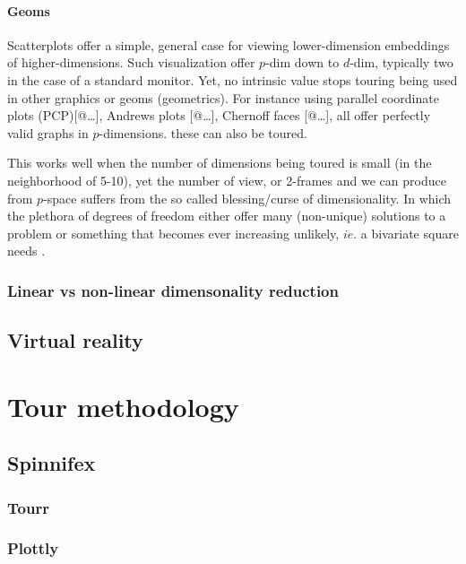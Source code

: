 \documentclass{monashthesis}
\theoremstyle{definition}
\theoremstyle{definition}
\theoremstyle{definition}
\theoremstyle{remark}
\begin{document}
\subsubsection{Geoms}\label{geoms}

Scatterplots offer a simple, general case for viewing lower-dimension
embeddings of higher-dimensions. Such visualization offer \(p\)-dim down
to \(d\)-dim, typically two in the case of a standard monitor. Yet, no
intrinsic value stops touring being used in other graphics or geoms
(geometrics). For instance using parallel coordinate plots
(PCP){[}@\ldots{}{]}, Andrews plots {[}@\ldots{}{]}, Chernoff faces
{[}@\ldots{}{]}, all offer perfectly valid graphs in \(p\)-dimensions.
these can also be toured.

This works well when the number of dimensions being toured is small (in
the neighborhood of 5-10), yet the number of view, or 2-frames and we
can produce from \(p\)-space suffers from the so called blessing/curse
of dimensionality. In which the plethora of degrees of freedom either
offer many (non-unique) solutions to a problem or something that becomes
ever increasing unlikely, \(ie.\) a bivariate square needs .

\subsection{Linear vs non-linear dimensonality
reduction}\label{linear-vs-non-linear-dimensonality-reduction}

\section{Virtual reality}\label{virtual-reality}

\chapter{Tour methodology}\label{ch:tour}

\section{Spinnifex}\label{spinnifex}

\subsection{Tourr}\label{tourr}

\subsection{Plottly}\label{plottly}
\end{document}

